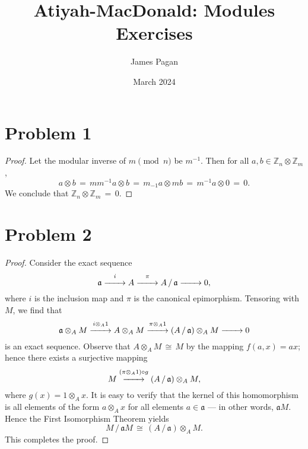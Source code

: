 \documentclass[11pt]{article}
\title{Atiyah-MacDonald: Modules Exercises}
\author{James Pagan}
\date{March 2024}
\renewcommand{\longrightarrow}{\xrightarrow{\hspace*{0.7cm}}}
\begin{document}
\maketitle
\tableofcontents
\newpage


\section{Problem 1}

\begin{proof}
  Let the modular inverse of $m \pmod{n}$ be $m^{-1}$. Then for all $a, b \in \mathbb{Z}_{n} \otimes \mathbb{Z}_{m}$,
  \[
    a \otimes b \, = \, mm^{-1}a \otimes b \, = \, m_{-1}a \otimes mb \, = \, m^{-1}a \otimes 0 \, = \, 0.
  \]
  We conclude that $\mathbb{Z}_{n} \otimes \mathbb{Z}_{m} \, = \, 0$.
\end{proof}



\section{Problem 2}

\begin{proof}
  Consider the exact sequence
  \[
    \mathfrak{a} \stackrel{i}{\longrightarrow} A \stackrel{\pi}{\longrightarrow} A \, / \, \mathfrak{a} \longrightarrow 0,
  \]
  where $i$ is the inclusion map and $\pi$ is the canonical epimorphism. Tensoring with $M$, we find that
  \[
    \mathfrak{a} \otimes_{A} M \stackrel{i \otimes_{A} 1}{\longrightarrow} A \otimes_{A} M \stackrel{\pi \otimes_{A} 1}{\longrightarrow} (A \, / \, \mathfrak{a}) \otimes_{A} M \longrightarrow 0
  \]
  is an exact sequence. Observe that $A \otimes_{A} M \, \cong \, M$ by the mapping $f(a, x) = ax$; hence there exists a surjective mapping
  \[
    M \stackrel{(\pi \otimes_{A} 1) \circ g}{\longrightarrow} (A \, / \, \mathfrak{a}) \otimes_{A} M,
  \]
  where $g(x) = 1 \otimes_{A} x$. It is easy to verify that the kernel of this homomorphism is all elements of the form $a \otimes_{A} x$ for all elements $a \in \mathfrak{a}$ --- in other words, $\mathfrak{a} M$. Hence the First Isomorphism Theorem yields
  \[
    M \, / \, \mathfrak{a} M \, \cong \, (A \, / \, \mathfrak{a}) \otimes_{A} M.
  \]
  This completes the proof.
\end{proof}

\end{document}
